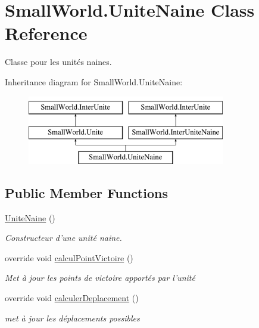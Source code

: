 \hypertarget{class_small_world_1_1_unite_naine}{\section{Small\-World.\-Unite\-Naine Class Reference}
\label{class_small_world_1_1_unite_naine}
}


Classe pour les unités naines.  


Inheritance diagram for Small\-World.\-Unite\-Naine\-:\begin{figure}[H]
\begin{center}
\leavevmode
\includegraphics[height=3.000000cm]{class_small_world_1_1_unite_naine}
\end{center}
\end{figure}
\subsection*{Public Member Functions}
\begin{DoxyCompactItemize}
\item 
\hyperlink{class_small_world_1_1_unite_naine_ae032047791cee62b77c1b7aed2e6f3da}{Unite\-Naine} ()
\begin{DoxyCompactList}\small\item\em Constructeur d'une unité naine. \end{DoxyCompactList}\item 
\hypertarget{class_small_world_1_1_unite_naine_aceabdf1ae46c14b18a9acfebe821a07b}{override void \hyperlink{class_small_world_1_1_unite_naine_aceabdf1ae46c14b18a9acfebe821a07b}{calcul\-Point\-Victoire} ()}\label{class_small_world_1_1_unite_naine_aceabdf1ae46c14b18a9acfebe821a07b}

\begin{DoxyCompactList}\small\item\em Met à jour les points de victoire apportés par l'unité \end{DoxyCompactList}\item 
override void \hyperlink{class_small_world_1_1_unite_naine_a487e42750e74fbf551d1e55b48101c72}{calculer\-Deplacement} ()
\begin{DoxyCompactList}\small\item\em met à jour les déplacements possibles \end{DoxyCompactList}\end{DoxyCompactItemize}
